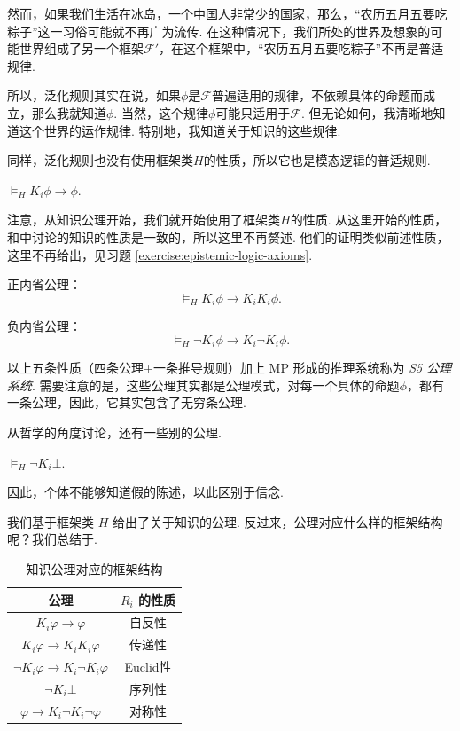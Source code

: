 然而，如果我们生活在冰岛，一个中国人非常少的国家，那么，“农历五月五要吃粽子”这一习俗可能就不再广为流传. 在这种情况下，我们所处的世界及想象的可能世界组成了另一个框架$\mathcal F'$，在这个框架中，“农历五月五要吃粽子”不再是普适规律. 

所以，泛化规则其实在说，如果$\phi$是$\mathcal F$普遍适用的规律，不依赖具体的命题而成立，那么我就知道$\phi$. 当然，这个规律$\phi$可能只适用于$\mathcal F$. 但无论如何，我清晰地知道这个世界的运作规律. 特别地，我知道关于知识的这些规律. 

同样，泛化规则也没有使用框架类$H$的性质，所以它也是模态逻辑的普适规则. 

\begin{proposition}\label{proposition:knowledge-axiom}
$\vDash_H K_i\phi\to\phi$.
\end{proposition}

注意，从知识公理开始，我们就开始使用了框架类$H$的性质. 从这里开始的性质，和中讨论的知识的性质是一致的，所以这里不再赘述. 他们的证明类似前述性质，这里不再给出，见习题 \ref{exercise:epistemic-logic-axioms}.

\begin{proposition}[内省公理]\label{proposition:knowledge-introspection}
正内省公理：
\[\vDash_H K_i\phi\to K_iK_i\phi.\]

负内省公理：
\[\vDash_H \neg K_i\phi\to K_i\neg K_i\phi.\]
\end{proposition}

以上五条性质（四条公理+一条推导规则）加上 MP 形成的推理系统称为 \textit{S5 公理系统}. 需要注意的是，这些公理其实都是公理模式，对每一个具体的命题$\phi$，都有一条公理，因此，它其实包含了无穷条公理. 

从哲学的角度讨论，还有一些别的公理. 

\begin{proposition}[一致性公理]\label{proposition:knowledge-consistency}
$\vDash_H\neg K_i\bot$.
\end{proposition}

因此，个体不能够知道假的陈述，以此区别于信念. 

我们基于框架类 $H$ 给出了关于知识的公理. 反过来，公理对应什么样的框架结构呢？我们总结于.

\begin{table}[ht]
\centering
    \begin{tabular}{c|c}
        \toprule 公理 &  $R_i$ 的性质 \\
        \midrule $K_i \varphi \to \varphi$ & 自反性 \\
        $K_i \varphi \to K_i K_i \varphi$ & 传递性 \\
        $\neg K_i \varphi \to K_i \neg K_i \varphi$ & Euclid性 \\
        $\neg K_i\bot$  & 序列性\\
        $\varphi \to K_i \neg K_i \neg \varphi$ & 对称性 \\
        \bottomrule
    \end{tabular}
    \caption{知识公理对应的框架结构} \label{tab:epistemic-axiom-structure}
\end{table}

